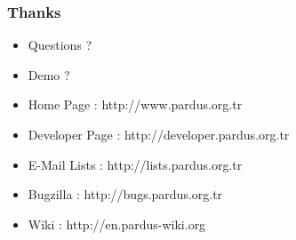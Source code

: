 \documentclass{beamer}
\begin{document}
\frame
{
    \frametitle{Thanks}
    \begin{itemize}
        \item Questions ?
	\item Demo ?
    \end{itemize}

    \begin{itemize}
        \item Home Page : http://www.pardus.org.tr
        \item Developer Page : http://developer.pardus.org.tr
        \item E-Mail Lists : http://lists.pardus.org.tr
        \item Bugzilla : http://bugs.pardus.org.tr
        \item Wiki : http://en.pardus-wiki.org
    \end{itemize}

}
\end{document}
